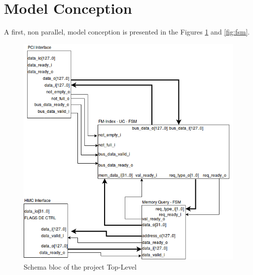 \section{Model Conception}

A first, non parallel, model conception is presented in the Figures \ref{fig:seqschema} and \ref{fig:fsm}.\\
\begin{figure}[H]
    \centering
    \includegraphics[scale = 0.5]{Figures/schema_bloc.png}
    \caption{Schema bloc of the project Top-Level}
    \label{fig:seqschema}
\end{figure}

